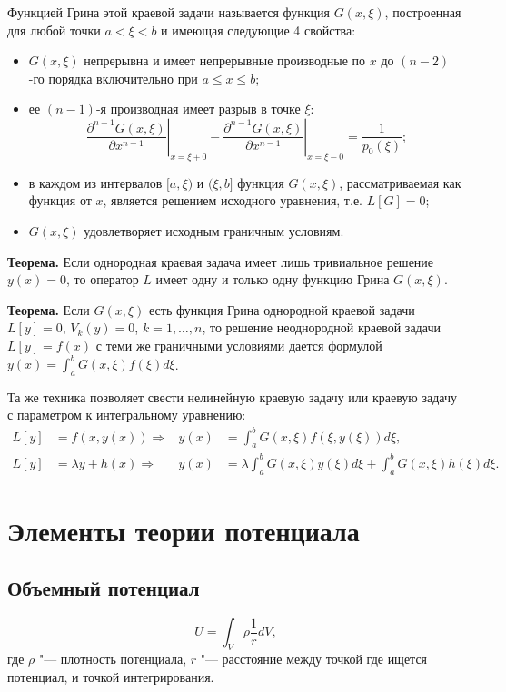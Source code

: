 \documentclass[a4paper,12pt]{article}
\begin{document}
Функцией Грина этой краевой задачи называется функция $G(x,\xi)$,
построенная для любой точки $a<\xi<b$ и имеющая следующие 4 свойства:
\begin{itemize}
\item $G(x,\xi)$ непрерывна и имеет непрерывные производные по $x$
до $(n-2)$-го порядка включительно при $a\le x\le b$;
\item ее $(n-1)$-я производная имеет разрыв в точке $\xi$:
$$\left.\frac{\partial^{n-1}G(x,\xi)}{\partial x^{n-1}}\right|_{x=\xi+0}
    -\left.\frac{\partial^{n-1}G(x,\xi)}{\partial x^{n-1}}\right|_{x=\xi-0}
    =\frac{1}{p_0(\xi)};$$
\item в каждом из интервалов $[a,\xi)$ и $(\xi,b]$ функция $G(x,\xi)$,
рассматриваемая как функция от $x$, является решением исходного уравнения,
т.е. $L[G]=0$;
\item $G(x,\xi)$ удовлетворяет исходным граничным условиям.
\end{itemize}

\textbf{Теорема.} Если однородная краевая задача имеет лишь тривиальное решение
$y(x)=0$, то оператор $L$ имеет одну и только одну функцию Грина $G(x,\xi)$.

\textbf{Теорема.} Если $G(x,\xi)$ есть функция Грина однородной краевой задачи
$L[y]=0$, $V_k(y)=0$, $k=1,\dots,n$, то решение неоднородной краевой задачи
$L[y]=f(x)$ с теми же граничными условиями дается формулой
$y(x)=\int_{a}^{b}G(x,\xi)f(\xi)d\xi$.

Та же техника позволяет свести нелинейную краевую задачу
или краевую задачу с параметром к интегральному уравнению:
\begin{align*}
L[y]&=f(x,y(x)) \Rightarrow
    &y(x)&=\int_a^b G(x,\xi)f(\xi,y(\xi))d\xi,\\
L[y]&=\lambda y+h(x) \Rightarrow
    &y(x)&=\lambda\int_a^b G(x,\xi)y(\xi)d\xi+\int_a^b G(x,\xi)h(\xi)d\xi.
\end{align*}


\section{Элементы теории потенциала}

\subsection{Объемный потенциал}

$$U=\int_V\rho\frac{1}{r}dV,$$
где $\rho$ "--- плотность потенциала, $r$ "--- расстояние между точкой
где ищется потенциал, и точкой интегрирования.
\end{document}
